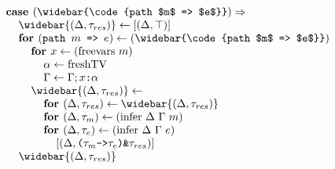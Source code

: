 \documentclass[acmsmall]{acmart}
\begin{document}
\begin{figure*}[h]
\[\begin{array}[t]{@{} l}
    \I \B{case } (\widebar{\code{path $m$ => $e$}})  \Rightarrow  
    \\
    \I\I \widebar{(\Delta, \tau_{res})} \leftarrow [(\Delta, \top)]
    \\
    \I\I \B{for } (\code{path $m$ => $e$}) \leftarrow (\widebar{\code{path $m$ => $e$}}) 
    \\
    \I\I\I \B{for } x \leftarrow (\F{freevars } m)
    \\
    \I\I\I\I \alpha \leftarrow \F{freshTV} 
    \\
    \I\I\I\I \Gamma \leftarrow \Gamma;\code{$x$:$\alpha$}
    \\
    \I\I\I \widebar{(\Delta, \tau_{res})} \leftarrow
    \\
    \I\I\I\I \B{for } (\Delta, \tau_{res}) \leftarrow \widebar{(\Delta, \tau_{res})} 
    \\
    \I\I\I\I \B{for } (\Delta, \tau_{m}) \leftarrow (\F{infer } \Delta\ \Gamma\ m) 
    \\
    \I\I\I\I \B{for } (\Delta, \tau_{e}) \leftarrow (\F{infer } \Delta\ \Gamma\ e) 
    \\
    \I\I\I\I\I [(\Delta, \code{($\tau_{m}$->$\tau_{e}$)\&$\tau_{res}$})]
    \\
    \I\I \widebar{(\Delta, \tau_{res})}

    \\


\end{array}\]
\end{figure*}
\end{document}
